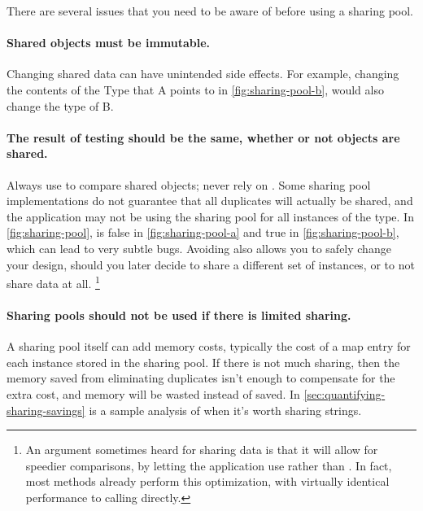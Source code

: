 There are several issues that you need to be aware of before using a sharing
pool.
\paragraph{Shared objects must be immutable.} Changing shared data can
have unintended side effects. For example, 
changing the contents of the Type that A points to in
\autoref{fig:sharing-pool-b}, would also change the type of B.

\paragraph{The result of  testing should be the same,
whether or not objects are shared.}
Always use  to compare shared objects; never rely on \code{==}.
Some sharing pool implementations do not guarantee that all
duplicates will actually be shared, and the application may not be using the
sharing pool for all instances of the type. In \autoref{fig:sharing-pool},
 is false in \ref{fig:sharing-pool-a} and true in
\ref{fig:sharing-pool-b}, which can lead to very subtle bugs.
Avoiding \code{==} also allows
you to safely change your design, should you later decide to share a different set of instances,
or to not share data at all.
\footnote{An argument sometimes heard for sharing data is that it will
allow for speedier comparisons, by letting the application use \code{==} rather
than . In fact, most
 methods already perform this optimization, with virtually
identical performance to calling \code{==} directly.}
 
\paragraph{Sharing pools should not be used if there is limited sharing.}
A sharing pool itself can add
memory costs, typically the cost of a map entry for each instance stored in the
sharing pool.
If there is not much sharing, then the memory saved from
eliminating duplicates isn't enough to compensate for the
extra cost, and memory will be wasted instead of saved.  In \autoref{sec:quantifying-sharing-savings} is
a sample analysis of when it's worth sharing strings.


